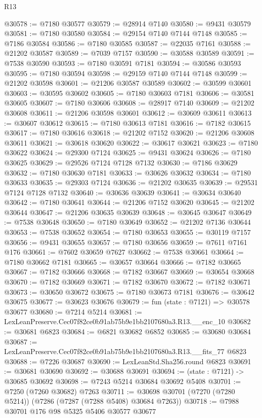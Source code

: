 \begin{lexlean}{R13}
\begin{coremodule}
@30578 := @7180 @30577
@30579 := @28914 @7140
@30580 := @9431 @30579
@30581 := @7180 @30580
@30584 := @29154 @7140 @7144 @7148
@30585 := @7186 @30584
@30586 := @7180 @30585
@30587 := @22035 @7161
@30588 := @21202 @30587
@30589 := @7039 @7157
@30590 := @30588 @30589
@30591 := @7538 @30590
@30593 := @7180 @30591 @7181
@30594 := @30586 @30593
@30595 := @7180 @30594
@30598 := @29159 @7140 @7144 @7148
@30599 := @21202 @30598
@30601 := @21206 @30587 @30589
@30602 := @30599 @30601
@30603 := @30595 @30602
@30605 := @7180 @30603 @7181
@30606 := @30581 @30605
@30607 := @7180 @30606
@30608 := @28917 @7140
@30609 := @21202 @30608
@30611 := @21206 @30598 @30601
@30612 := @30609 @30611
@30613 := @30607 @30612
@30615 := @7180 @30613 @7181
@30616 := @7182 @30615
@30617 := @7180 @30616
@30618 := @21202 @7152
@30620 := @21206 @30608 @30611
@30621 := @30618 @30620
@30622 := @30617 @30621
@30623 := @7180 @30622
@30624 := @29300 @7124
@30625 := @9431 @30624
@30626 := @7180 @30625
@30629 := @29526 @7124 @7128 @7132
@30630 := @7186 @30629
@30632 := @7180 @30630 @7181
@30633 := @30626 @30632
@30634 := @7180 @30633
@30635 := @29303 @7124
@30636 := @21202 @30635
@30639 := @29531 @7124 @7128 @7132
@30640 := @30636 @30639
@30641 := @30634 @30640
@30642 := @7180 @30641
@30644 := @21206 @7152 @30620
@30645 := @21202 @30644
@30647 := @21206 @30635 @30639
@30648 := @30645 @30647
@30649 := @7538 @30648
@30650 := @7180 @30649
@30652 := @21202 @7136 @30644
@30653 := @7538 @30652
@30654 := @7180 @30653
@30655 := @30119 @7157
@30656 := @9431 @30655
@30657 := @7180 @30656
@30659 := @7611 @7161 @176
@30661 := @7602 @30659 @7627
@30662 := @7538 @30661
@30664 := @7180 @30662 @7181
@30665 := @30657 @30664
@30666 := @7182 @30665
@30667 := @7182 @30666
@30668 := @7182 @30667
@30669 := @30654 @30668
@30670 := @7182 @30669
@30671 := @7182 @30670
@30672 := @7182 @30671
@30673 := @30650 @30672
@30675 := @7180 @30673 @7181
@30676 := @30642 @30675
@30677 := @30623 @30676
@30679 := fun (state : @7121) => @30578 @30677
@30680 := @7214 @5214
@30681 := LexLeanPreserve.Cec07f82ce0b91ab75b9e1bb2107680a3.R13.__enc_10
@30682 := @30681 @6823
@30684 := @6821 @30682 @6852
@30685 := @30680 @30684
@30687 := LexLeanPreserve.Cec07f82ce0b91ab75b9e1bb2107680a3.R13.__fits_77 @6823
@30688 := @7226 @30687
@30690 := LexLeanStd.Sha256.round @6823
@30691 := @30681 @30690
@30692 := @30688 @30691
@30694 := (state : @7121) -> @30685 @30692
@30698 := @7243 @5214 @30684 @30692 @5408
@30701 := @7250 (@7260 @30682) @7263
@30711 := @30698 @30701 (@7270 (@7280 @5214)) (@7286 (@7287 (@7288 @5408) @30684 @7263))
@30718 := @7988 @30701 @176 @98 @5325 @5406 @30577 @30677

\end{coremodule}
\end{lexlean}
